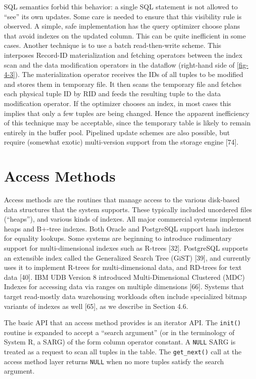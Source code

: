 \documentclass[a4paper,11pt,twoside,openright]{book}
\begin{document}
SQL semantics forbid this behavior: a single SQL statement is not
allowed to ``see'' its own updates. Some care is needed to ensure that
this visibility rule is observed. A simple, safe implementation has the
query optimizer choose plans that avoid indexes on the updated column.
This can be quite inefficient in some cases. Another technique is to use
a batch read-then-write scheme. This interposes Record-ID
materialization and fetching operators between the index scan and the
data modification operators in the dataflow (right-hand side of \autoref{fig-4-3}). The materialization operator receives the IDs of all tuples to be
modified and stores them in temporary file. It then scans the temporary
file and fetches each physical tuple ID by RID and feeds the resulting
tuple to the data modification operator. If the optimizer chooses an
index, in most cases this implies that only a few tuples are being
changed. Hence the apparent inefficiency of this technique may be
acceptable, since the temporary table is likely to remain entirely in
the buffer pool. Pipelined update schemes are also possible, but require
(somewhat exotic) multi-version support from the storage engine
{[}74{]}.

\hypertarget{access-methods}{%
\section{Access Methods}\label{access-methods}}

Access methods are the routines that manage access to the various
disk-based data structures that the system supports. These typically
included unordered files (``heaps''), and various kinds of indexes. All
major commercial systems implement heaps and B+-tree indexes. Both
Oracle and PostgreSQL support hash indexes for equality lookups. Some
systems are beginning to introduce rudimentary support for
multi-dimensional indexes such as R-trees {[}32{]}. PostgreSQL supports
an extensible index called the Generalized Search Tree (GiST) {[}39{]},
and currently uses it to implement R-trees for multi-dimensional data,
and RD-trees for text data {[}40{]}. IBM UDB Version 8 introduced
Multi-Dimensional Clustered (MDC) Indexes for accessing data via ranges
on multiple dimensions {[}66{]}. Systems that target read-mostly data
warehousing workloads often include specialized bitmap variants of
indexes as well {[}65{]}, as we describe in Section 4.6.

The basic API that an access method provides is an iterator API. The
\texttt{init()} routine is expanded to accept a ``search argument'' (or in the
terminology of System R, a SARG) of the form column operator constant. A
\texttt{NULL} SARG is treated as a request to scan all tuples in the table. The
\texttt{get\_next()} call at the access method layer returns \texttt{NULL} when no more
tuples satisfy the search argument.
\end{document}
